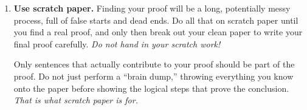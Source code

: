 \begin{enumerate}
\item \textbf{Use scratch paper.} Finding your proof will be a long, potentially messy process, full of false starts and dead ends. Do all that on scratch paper
until you find a real proof, and only then break out your clean paper to write your final proof carefully. \emph{Do not hand in your scratch work!}

Only sentences that actually contribute to your proof should be part of the proof. Do not just perform a ``brain dump,'' throwing everything you know onto the paper before showing the logical steps that prove the conclusion. \emph{That is what scratch paper is for.}

\end{enumerate}
